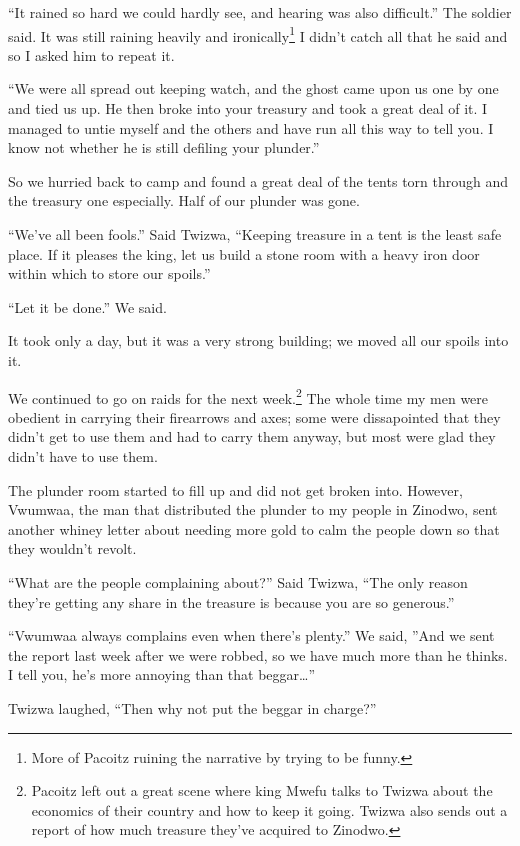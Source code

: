 ``It rained so hard we could hardly see, and hearing was also difficult.'' The soldier said. It was still raining heavily and ironically\footnote{More of Pacoitz ruining the narrative by trying to be funny.} I didn't catch all that he said and so I asked him to repeat it.

``We were all spread out keeping watch, and the ghost came upon us one by one and tied us up. He then broke into your treasury and took a great deal of it. I managed to untie myself and the others and have run all this way to tell you. I know not whether he is still defiling your plunder.''

So we hurried back to camp and found a great deal of the tents torn through and the treasury one especially. Half of our plunder was gone.

``We've all been fools.'' Said Twizwa, ``Keeping treasure in a tent is the least safe place. If it pleases the king, let us build a stone room with a heavy iron door within which to store our spoils.''

``Let it be done.'' We said.

It took only a day, but it was a very strong building; we moved all our spoils into it.

\tbreak

We continued to go on raids for the next week.\footnote{Pacoitz left out a great scene where king Mwefu talks to Twizwa about the economics of their country and how to keep it going. Twizwa also sends out a report of how much treasure they've acquired to Zinodwo.} The whole time my men were obedient in carrying their firearrows and axes; some were dissapointed that they didn't get to use them and had to carry them anyway, but most were glad they didn't have to use them.

The plunder room started to fill up and did not get broken into. However, Vwumwaa, the man that distributed the plunder to my people in Zinodwo, sent another whiney letter about needing more gold to calm the people down so that they wouldn't revolt.

``What are the people complaining about?'' Said Twizwa, ``The only reason they're getting any share in the treasure is because you are so generous.''

``Vwumwaa always complains even when there's plenty.'' We said, ''And we sent the report last week after we were robbed, so we have much more than he thinks. I tell you, he's more annoying than that beggar\ldots''

Twizwa laughed, ``Then why not put the beggar in charge?''

